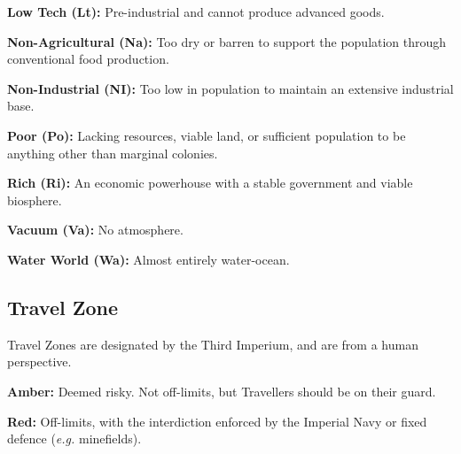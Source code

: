 \documentclass[landscape]{cheatsheet}
\begin{document}
\begin{multicols}{2}
\textbf{Low Tech (Lt):} Pre-industrial and cannot produce advanced
goods.

\textbf{Non-Agricultural (Na):} Too dry or barren to support the
population through conventional food production.

\textbf{Non-Industrial (NI):} Too low in population to maintain an
extensive industrial base.

\textbf{Poor (Po):} Lacking resources, viable land, or sufficient
population to be anything other than marginal colonies.

\textbf{Rich (Ri):} An economic powerhouse with a stable government
and viable biosphere.

\textbf{Vacuum (Va):} No atmosphere.

\textbf{Water World (Wa):} Almost entirely water-ocean.

\subsection{Travel Zone}

Travel Zones are designated by the Third Imperium, and are from a
human perspective.

\textbf{Amber:} Deemed risky.  Not off-limits, but Travellers should
be on their guard.

\textbf{Red:} Off-limits, with the interdiction enforced by the
Imperial Navy or fixed defence (\textit{e.g.} minefields).

\end{multicols}
\end{document}
